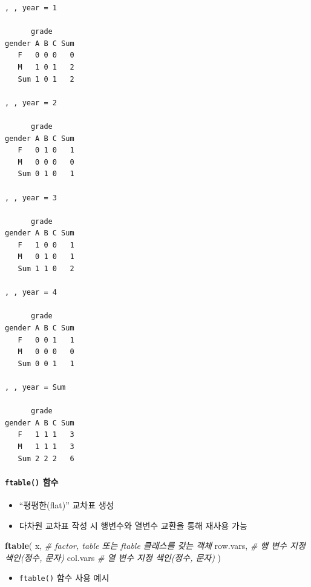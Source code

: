 \documentclass[
  11pt,
]{krantz}
\newenvironment{Shaded}{\begin{snugshade}}{\end{snugshade}}
\newcommand{\CommentTok}[1]{\textcolor[rgb]{0.37,0.37,0.37}{\textit{#1}}}
\newcommand{\KeywordTok}[1]{\textcolor[rgb]{0.27,0.27,0.27}{\textbf{#1}}}
\newcommand{\NormalTok}[1]{#1}
\providecommand{\tightlist}{%
  \setlength{\itemsep}{0pt}\setlength{\parskip}{0pt}}
\begin{document}
\begin{verbatim}
, , year = 1

      grade
gender A B C Sum
   F   0 0 0   0
   M   1 0 1   2
   Sum 1 0 1   2

, , year = 2

      grade
gender A B C Sum
   F   0 1 0   1
   M   0 0 0   0
   Sum 0 1 0   1

, , year = 3

      grade
gender A B C Sum
   F   1 0 0   1
   M   0 1 0   1
   Sum 1 1 0   2

, , year = 4

      grade
gender A B C Sum
   F   0 0 1   1
   M   0 0 0   0
   Sum 0 0 1   1

, , year = Sum

      grade
gender A B C Sum
   F   1 1 1   3
   M   1 1 1   3
   Sum 2 2 2   6
\end{verbatim}

\normalsize

\hypertarget{tab-fun3}{%
\paragraph{\texorpdfstring{\texttt{ftable()} 함수}{ftable() 함수}}\label{tab-fun3}}

\begin{itemize}
\tightlist
\item
  ``평평한(flat)'' 교차표 생성
\item
  다차원 교차표 작성 시 행변수와 열변수 교환을 통해 재사용 가능
\end{itemize}

\footnotesize

\begin{Shaded}
\begin{Highlighting}[]
\KeywordTok{ftable}\NormalTok{(}
\NormalTok{  x,  }\CommentTok{# factor, table 또는 ftable 클래스를 갖는 객체}
\NormalTok{  row.vars, }\CommentTok{# 행 변수 지정 색인(정수, 문자)}
\NormalTok{  col.vars  }\CommentTok{# 열 변수 지정 색인(정수, 문자)}
\NormalTok{)}
\end{Highlighting}
\end{Shaded}

\normalsize

\begin{itemize}
\tightlist
\item
  \texttt{ftable()} 함수 사용 예시
\end{itemize}
\end{document}
